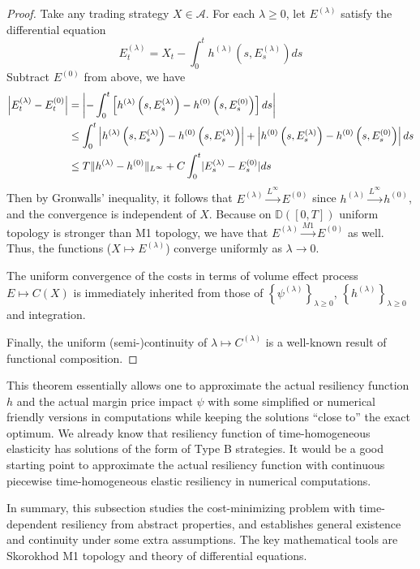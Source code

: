\documentclass[openany,oneside]{article}
\theoremstyle{definition}
\theoremstyle{remark}
\DeclarePairedDelimiter{\abs}{\lvert}{\rvert} %
\DeclarePairedDelimiter{\norm}{\lVert}{\rVert} %
\begin{document}
\begin{proof}
Take any trading strategy $X\in \mathcal{A}$. For each $\lambda\ge 0$, let $E^{(\lambda)}$ satisfy the differential equation
$$E^{(\lambda)}_t = X_t - \int_0^t h^{(\lambda)}\left(s,E^{(\lambda)}_s\right) ds$$
Subtract $E^{(0)}$ from above, we have
\begin{align*}
\left| E^{(\lambda)}_t - E^{(0)}_t \right| &= \left| -\int_0^t \left[h^{(\lambda)}\left(s,E^{(\lambda)}_s\right) - h^{(0)}\left(s,E^{(0)}_s\right) \right] ds \right| \\
&\le \int_0^t \left|  h^{(\lambda)}\left(s,E^{(\lambda)}_s\right) - h^{(0)}\left(s,E^{(\lambda)}_s\right)\right| + \left| h^{(0)}\left(s,E^{(\lambda)}_s\right) - h^{(0)}\left(s,E^{(0)}_s\right)\right| ds \\
&\le T \norm{h^{(\lambda)}-h^{(0)}}_{L^\infty} + C \int_0^t \abs{E^{(\lambda)}_s-E^{(0)}_s} ds
\end{align*}
Then by Gronwalls' inequality, it follows that $E^{(\lambda)} \xrightarrow{L^\infty} E^{(0)}$ since $h^{(\lambda)} \xrightarrow{L^\infty} h^{(0)}$, and the convergence is independent of $X$. Because on $\mathbb{D}([0,T])$ uniform topology is stronger than M1 topology, we have that $E^{(\lambda)} \xrightarrow{M1} E^{(0)}$ as well. Thus, the functions ($X\mapsto E^{(\lambda)}$) converge uniformly as $\lambda \to 0$.

The uniform convergence of the costs in terms of volume effect process $E\mapsto C(X)$ is immediately inherited from those of $\left\{\psi^{(\lambda)}\right\}_{\lambda\ge 0}$, $\left\{h^{(\lambda)}\right\}_{\lambda\ge 0}$ and integration.

Finally, the uniform (semi-)continuity of $\lambda \mapsto C^{(\lambda)}$ is a well-known result of functional composition.
\end{proof}

This theorem essentially allows one to approximate the actual resiliency function $h$ and the actual margin price impact $\psi$ with some simplified or numerical friendly versions in computations while keeping the solutions ``close to'' the exact optimum. We already know that resiliency function of time-homogeneous elasticity has solutions of the form of Type B strategies. It would be a good starting point to approximate the actual resiliency function with continuous piecewise time-homogeneous elastic resiliency in numerical computations. 

In summary, this subsection studies the cost-minimizing problem with time-dependent resiliency from abstract properties, and establishes general existence and continuity under some extra assumptions. The key mathematical tools are Skorokhod M1 topology and theory of differential equations.
\end{document}
